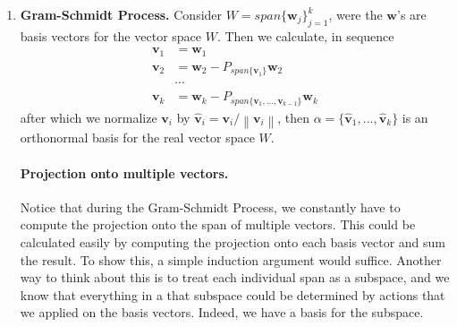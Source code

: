 \documentclass[oneside, 12pt]{book}
\newcommand{\settag}[1]{\renewcommand{\theenumi}{#1}}
\newcommand{\tbf}[1]{\textbf{#1}}
\newcommand{\norm}[1]{\left\lVert#1\right\rVert}
\newcommand{\para}[1]{\item \tbf{#1}}
\newcommand{\vv}{\mathbf{v}}
\newcommand{\vw}{\mathbf{w}}
\begin{document}
\begin{enumerate}
    \settag{4.4.9*}
    \para{Gram-Schmidt Process.} Consider $W = span\{\vw_j\}_{j=1}^k$, were the $\vw$'s are 
    basis vectors for the vector space $W$. Then we calculate, in sequence
    \begin{align*}
        \vv_1 &= \vw_1 \\
        \vv_2 &= \vw_2 - P_{span\{\vv_1\}}\vw_2 \\
              &\cdots  \\
        \vv_k &= \vw_k - P_{span\{\vv_1,...,\vv_{k-1}\}}\vw_k
    \end{align*}
    after which we normalize $\vv_i$ by $\hat{\vv}_i = \vv_i/\norm{\vv_i}$, then $\alpha = 
    \{\hat{\vv}_1,...,\hat{\vv}_k\}$ is an orthonormal basis for the real vector space $W$.
    \paragraph{Projection onto multiple vectors.} Notice that during the Gram-Schmidt Process,
    we constantly have to compute the projection onto the span of multiple vectors. This could
    be calculated easily by computing the projection onto each basis vector and sum the result.
    To show this, a simple induction argument would suffice. Another way to think about this is
    to treat each individual span as a subspace, and we know that everything in a that subspace
    could be determined by actions that we applied on the basis vectors. Indeed, we have a basis
    for the subspace.
\end{enumerate}
\end{document}
